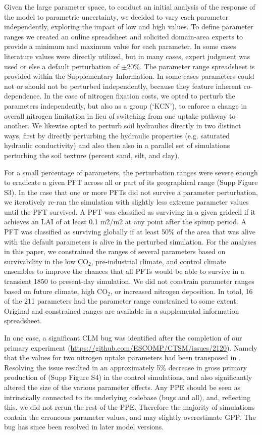 \documentclass[draft]{agujournal2019}
\begin{document}
Given the large parameter space, to conduct an initial analysis of the response of the model to parametric uncertainty, we decided to vary each parameter independently, exploring the impact of low and high values. To define parameter ranges we created an online spreadsheet and solicited domain-area experts to provide a minimum and maximum value for each parameter. In some cases literature values were directly utilized, but in many cases, expert judgment was used or else a default perturbation of $\pm$20\%. The parameter range spreadsheet is provided within the Supplementary Information. In some cases parameters could not or should not be perturbed independently, because they feature inherent co-dependence. In the case of nitrogen fixation costs, we opted to perturb the parameters independently, but also as a group (`KCN'), to enforce a change in overall nitrogen limitation in lieu of switching from one uptake pathway to another. We likewise opted to perturb soil hydraulics directly in two distinct ways, first by directly perturbing the hydraulic properties (e.g. saturated hydraulic conductivity) and also then also in a parallel set of simulations perturbing the soil texture (percent sand, silt, and clay).

For a small percentage of parameters, the perturbation ranges were severe enough to eradicate a given PFT across all or part of its geographical range (Supp Figure S3). In the case that one or more PFTs did not survive a parameter perturbation, we iteratively re-ran the simulation with slightly less extreme parameter values until the PFT survived. A PFT was classified as surviving in a given gridcell if it achieves an LAI of at least 0.1 m2/m2 at any point after the spinup period. A PFT was classified as surviving globally if at least 50\% of the area that
was alive with the default parameters is alive in the perturbed simulation. For the analyses in this paper, we constrained the ranges of several parameters based on survivability in the low CO$_2$, pre-industrial climate, and control climate ensembles to improve the chances that all PFTs would be able to survive in a transient 1850 to present-day simulation. We did not constrain parameter ranges based on future climate, high CO$_2
$, or increased nitrogen deposition. In total, 16 of the 211 parameters had the parameter range constrained to some extent. Original and constrained ranges are available in a supplemental information spreadsheet.

In one case, a significant CLM bug was identified after the completion of our primary experiment (\url{https://github.com/ESCOMP/CTSM/issues/2120}). Namely that the values for two nitrogen uptake parameters had been transposed in . Resolving the issue resulted in an approximately 5\% decrease in gross primary production of (Supp Figure S4) in the control simulations, and also significantly altered the size of the various parameter effects. Any PPE should be seen as intrinsically connected to its underlying codebase (bugs and all), and, reflecting this, we did not rerun the rest of the PPE. Therefore the majority of simulations contain the erroneous parameter values, and may slightly overestimate GPP. The bug has since been resolved in later model versions.
\end{document}
